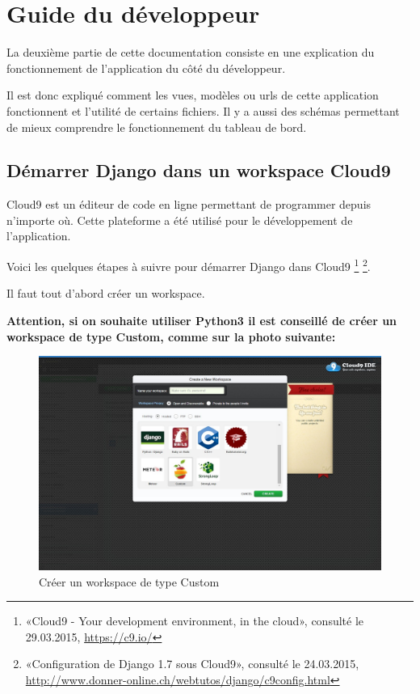 \documentclass[a4paper,10pt,french]{sphinxmanual}
\begin{document}
\chapter{Guide du développeur}
\label{documentation:guide-du-developpeur}\label{documentation::doc}
La deuxième partie de cette documentation consiste en une explication du
fonctionnement de l'application du côté du développeur.

Il est donc expliqué comment les vues, modèles ou urls de cette application
fonctionnent et l'utilité de certains fichiers. Il y a aussi des schémas
permettant de mieux comprendre le fonctionnement du tableau de bord.


\section{Démarrer Django dans un workspace Cloud9}
\label{documentation:demarrer-django-dans-un-workspace-cloud9}
Cloud9 est un éditeur de code en ligne permettant de programmer depuis n'importe
où. Cette plateforme a été utilisé pour le développement de l'application.

Voici les quelques étapes à suivre pour démarrer Django dans Cloud9 \footnote{
«Cloud9 - Your development environment, in the cloud»,
consulté le 29.03.2015,
\href{https://c9.io/}{https://c9.io/}
}
\footnote{
«Configuration de Django 1.7 sous Cloud9»,
consulté le 24.03.2015,
\href{http://www.donner-online.ch/webtutos/django/c9config.html}{http://www.donner-online.ch/webtutos/django/c9config.html}
}.

Il faut tout d'abord créer un workspace.

\textbf{Attention, si on souhaite utiliser Python3 il est conseillé de créer un
workspace de type Custom, comme sur la photo suivante:}
\begin{figure}[htbp]
\centering
\capstart

\includegraphics[width=0.600\linewidth]{Workspace.jpg}
\caption{Créer un workspace de type Custom}\end{figure}
\end{document}

